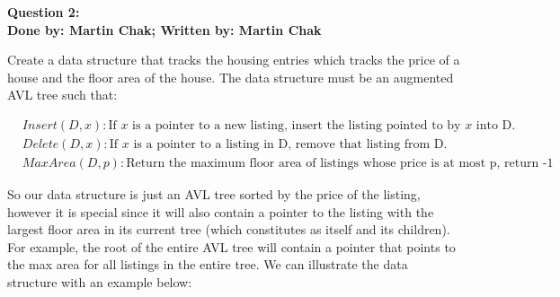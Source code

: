 \documentclass[20pt]{article}
\begin{document}
\noindent
\textbf{Question 2:}\\
\textbf{Done by: Martin Chak; Written by: Martin Chak}\\
\noindent
\begin{text}
    Create a data structure that tracks the housing entries which tracks the price of a house and the floor area of the house. The data structure must be an augmented AVL tree such that:
\end{text}
\begin{align*}
    &Insert(D, x): \text{If $x$ is a pointer to a new listing, insert the listing pointed to by $x$ into D.}\\
    &Delete(D, x): \text{If $x$ is a pointer to a listing in D, remove that listing from D.}\\
    &MaxArea(D, p): \text{Return the maximum floor area of listings whose price is at most p, return -1 if none}
\end{align*}
\noindent
\begin{text}
    So our data structure is just an AVL tree sorted by the price of the listing, however it is special since it will also contain a pointer to the listing with the largest floor area in its current tree (which constitutes as itself and its children). For example, the root of the entire AVL tree will contain a pointer that points to the max area for all listings in the entire tree. We can illustrate the data structure with an example below:
\end{text}

\begin{adjustwidth}{50pt}{25pt}
\end{adjustwidth}
\end{document}
